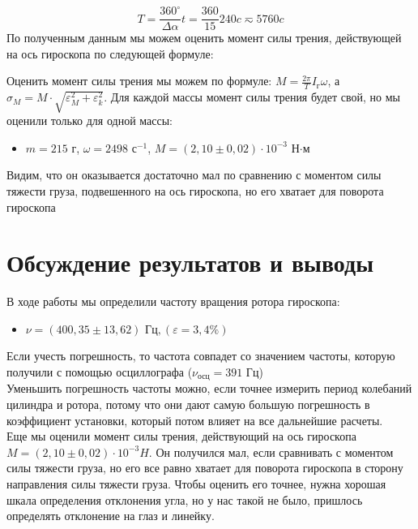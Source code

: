 \documentclass[a4paper,12pt]{article}
\begin{document}
	\
	$$T =\frac{360^\circ}{\Delta \alpha} t = \frac{360}{15}  240 c \eqsim 5760 c$$
	По полученным данным мы можем оценить момент силы трения, действующей на ось гироскопа по следующей формуле:
	
	Оценить момент силы трения мы можем по формуле: $M = \frac{2\pi}{T}I_{\text{г}} \omega$, а $\sigma_M = M\cdot\sqrt{\varepsilon_M^2+ \varepsilon_k^2}$. Для каждой массы момент силы трения будет свой, но мы оценили только для одной массы:
	
	\begin{itemize}
		\item $m = 215$ г, $\omega = 2498$ $\text{с}^{-1}$, $M = (2,10\pm0,02)\cdot10^{-3}$ Н$\cdot$м
	\end{itemize}  
	Видим, что он оказывается достаточно мал по сравнению с моментом силы тяжести груза, подвешенного на ось гироскопа, но его хватает для поворота гироскопа
	
	\section{Обсуждение результатов и выводы}
	
	В ходе работы мы определили частоту вращения ротора гироскопа:
	
	\begin{itemize}
		\item \underline{$ \nu = \left( 400,35 \pm 13,62 \right) \text{ Гц}, \left( \varepsilon = 3,4 \% \right)   $}
	\end{itemize}
	Если учесть погрешность, то частота совпадет со значением частоты, которую получили с помощью осциллографа ($ \nu_\text{осц} = 391 $ Гц)\\
	Уменьшить погрешность частоты можно, если точнее измерить период колебаний цилиндра и ротора, потому что они дают самую большую погрешность в коэффициент установки, который потом влияет на все дальнейшие расчеты.\\
	Еще мы оценили момент силы трения, действующий на ось гироскопа $M = (2,10\pm0,02)\cdot10^{-3} H$. Он получился мал, если сравнивать с моментом силы тяжести груза, но его все равно хватает для поворота гироскопа в сторону направления силы тяжести груза. Чтобы оценить его точнее, нужна хорошая шкала определения отклонения угла, но у нас такой не было, пришлось определять отклонение на глаз и линейку.
	
	
	
	
\end{document}
